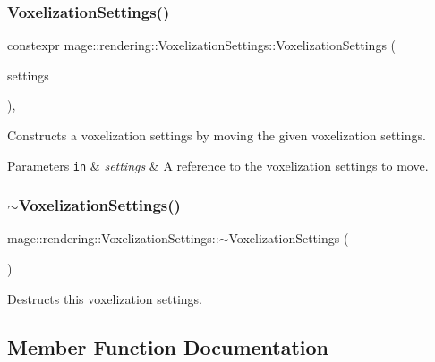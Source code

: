 \subsubsection{\texorpdfstring{Voxelization\+Settings()}{VoxelizationSettings()}\hspace{0.1cm}{\footnotesize\ttfamily [3/3]}}
{\footnotesize\ttfamily constexpr mage\+::rendering\+::\+Voxelization\+Settings\+::\+Voxelization\+Settings (\begin{DoxyParamCaption}\item[{\hyperlink{classmage_1_1rendering_1_1_voxelization_settings}{Voxelization\+Settings} \&\&}]{settings }\end{DoxyParamCaption})\hspace{0.3cm}{\ttfamily [default]}, {\ttfamily [noexcept]}}

Constructs a voxelization settings by moving the given voxelization settings.


\begin{DoxyParams}[1]{Parameters}
\mbox{\tt in}  & {\em settings} & A reference to the voxelization settings to move. \\
\hline
\end{DoxyParams}
\hypertarget{classmage_1_1rendering_1_1_voxelization_settings_aa9593796b2dd3b9d3a8f6b00ba225778}{}\label{classmage_1_1rendering_1_1_voxelization_settings_aa9593796b2dd3b9d3a8f6b00ba225778} 
\subsubsection{\texorpdfstring{$\sim$\+Voxelization\+Settings()}{~VoxelizationSettings()}}
{\footnotesize\ttfamily mage\+::rendering\+::\+Voxelization\+Settings\+::$\sim$\+Voxelization\+Settings (\begin{DoxyParamCaption}{ }\end{DoxyParamCaption})\hspace{0.3cm}{\ttfamily [default]}}

Destructs this voxelization settings. 

\subsection{Member Function Documentation}
\hypertarget{classmage_1_1rendering_1_1_voxelization_settings_a672f561214738cbb64252b332e717693}{}\label{classmage_1_1rendering_1_1_voxelization_settings_a672f561214738cbb64252b332e717693} 

